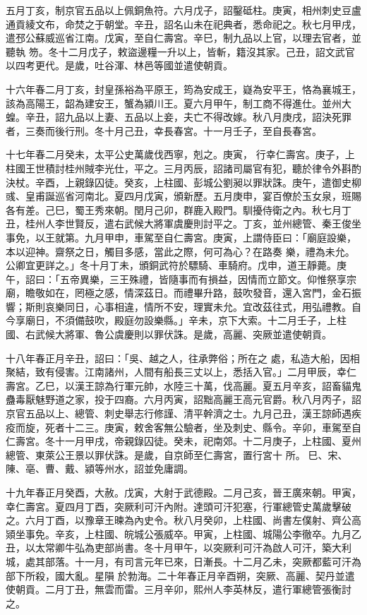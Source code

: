 \begin{pinyinscope}
 五月丁亥，制京官五品以上佩銅魚符。六月戊子，詔鑿砥柱。庚寅，相州刺史豆盧通貢綾文布，命焚之于朝堂。辛丑，詔名山未在祀典者，悉命祀之。秋七月甲戌，遣邳公蘇威巡省江南。戊寅，至自仁壽宮。辛巳，制九品以上官，以理去官者，並聽執
 笏。冬十二月戊子，敕盜邊糧一升以上，皆斬，籍沒其家。己丑，詔文武官以四考更代。是歲，吐谷渾、林邑等國並遣使朝貢。



 十六年春二月丁亥，封皇孫裕為平原王，筠為安成王，嶷為安平王，恪為襄城王，該為高陽王，韶為建安王，蟹為潁川王。夏六月甲午，制工商不得進仕。並州大蝗。辛丑，詔九品以上妻、五品以上妾，夫亡不得改嫁。秋八月庚戌，詔決死罪者，三奏而後行刑。冬十月己丑，幸長春宮。十一月壬子，至自長春宮。



 十七年春二月癸未，太平公史萬歲伐西寧，剋之。庚寅，
 行幸仁壽宮。庚子，上柱國王世積討桂州賊李光仕，平之。三月丙辰，詔諸司屬官有犯，聽於律令外斟酌決杖。辛酉，上親錄囚徒。癸亥，上柱國、彭城公劉昶以罪狀誅。庚午，遣御史柳彧、皇甫誕巡省河南北。夏四月戊寅，頒新歷。五月庚申，宴百僚於玉女泉，班賜各有差。己巳，蜀王秀來朝。閏月己卯，群鹿入殿門。馴擾侍衛之內。秋七月丁丑，桂州人李世賢反，遣右武候大將軍虞慶則討平之。丁亥，並州總管、秦王俊坐事免，以王就第。九月甲申，車駕至自仁壽宮。庚寅，上謂侍臣曰：「廟庭設樂，本以迎神。齋祭之日，觸目多感，當此之際，何可為心？在路奏
 樂，禮為未允。公卿宜更詳之。」冬十月丁未，頒銅武符於驃騎、車騎府。戊申，道王靜薨。庚午，詔曰：「五帝異樂，三王殊禮，皆隨事而有損益，因情而立節文。仰惟祭享宗廟，瞻敬如在，罔極之感，情深茲日。而禮畢升路，鼓吹發音，還入宮門，金石振響；斯則哀樂同日，心事相違，情所不安，理實未允。宜改茲往式，用弘禮教。自今享廟日，不須備鼓吹，殿庭勿設樂縣。」辛未，京下大索。十二月壬子，上柱國、右武候大將軍、魯公虞慶則以罪伏誅。是歲，高麗、突厥並遣使朝貢。



 十八年春正月辛丑，詔曰：「吳、越之人，往承弊俗；所在之
 處，私造大船，因相聚結，致有侵害。江南諸州，人間有船長三丈以上，悉括入官。」二月甲辰，幸仁壽宮。乙巳，以漢王諒為行軍元帥，水陸三十萬，伐高麗。夏五月辛亥，詔畜貓鬼蠱毒厭魅野道之家，投于四裔。六月丙寅，詔黜高麗王高元官爵。秋八月丙子，詔京官五品以上、總管、刺史舉志行修謹、清平幹濟之士。九月己丑，漢王諒師遇疾疫而旋，死者十二三。庚寅，敕舍客無公驗者，坐及刺史、縣令。辛卯，車駕至自仁壽宮。冬十一月甲戌，帝親錄囚徒。癸未，祀南郊。十二月庚子，上柱國、夏州總管、東萊公王景以罪伏誅。是歲，自京師至仁壽宮，置行宮十
 所。巳、宋、陳、亳、曹、戴、潁等州水，詔並免庸調。



 十九年春正月癸酉，大赦。戊寅，大射于武德殿。二月己亥，晉王廣來朝。甲寅，幸仁壽宮。夏四月丁酉，突厥利可汗內附。達頭可汗犯塞，行軍總管史萬歲擊破之。六月丁酉，以豫章王暕為內史令。秋八月癸卯，上柱國、尚書左僕射、齊公高熲坐事免。辛亥，上柱國、皖城公張威卒。甲寅，上柱國、城陽公李徹卒。九月乙丑，以太常卿牛弘為吏部尚書。冬十月甲午，以突厥利可汗為啟人可汗，築大利城，處其部落。十一月，有司言元年已來，日漸長。十二月乙未，突厥都藍可汗為部下所殺，國大亂。星隕
 於勃海。二十年春正月辛酉朔，突厥、高麗、契丹並遣使朝貢。二月丁丑，無雲而雷。三月辛卯，熙州人李英林反，遣行軍總管張衡討之。




\end{pinyinscope}
